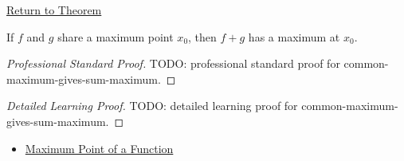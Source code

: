 \newpage
{}
\label{prf:common-maximum-gives-sum-maximum}

\begin{remark*}[Return]
\hyperref[thm:common-maximum-gives-sum-maximum]{Return to Theorem}
\end{remark*}

\begin{theorem*}
If \(f\) and \(g\) share a maximum point \(x_0\), then \(f+g\) has a maximum at \(x_0\).
\end{theorem*}

\begin{proof}[Professional Standard Proof]
\LRAProofBodyStart
TODO: professional standard proof for common-maximum-gives-sum-maximum.
\end{proof}

\begin{proof}[Detailed Learning Proof]
\LRAProofBodyStart
TODO: detailed learning proof for common-maximum-gives-sum-maximum.
\end{proof}

\begin{remark*}
\end{remark*}

\begin{dependencies}
\begin{itemize}
  \item \hyperref[def:function-maximum-point]{Maximum Point of a Function}
\end{itemize}
\end{dependencies}

\clearpage
